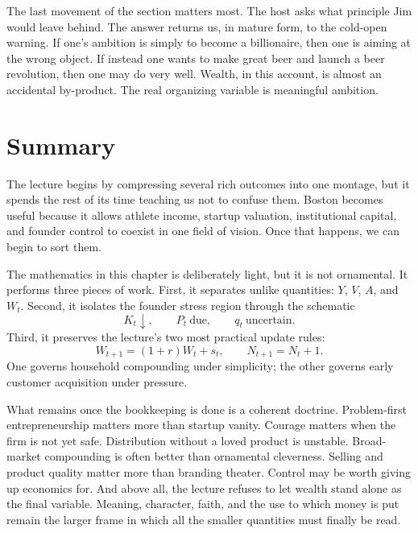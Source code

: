 The last movement of the section matters most. The host asks what principle Jim would leave behind. The answer returns us, in mature form, to the cold-open warning. If one's ambition is simply to become a billionaire, then one is aiming at the wrong object. If instead one wants to make great beer and launch a beer revolution, then one may do very well. Wealth, in this account, is almost an accidental by-product. The real organizing variable is meaningful ambition.

\section{Summary}

The lecture begins by compressing several rich outcomes into one montage, but it spends the rest of its time teaching us not to confuse them. Boston becomes useful because it allows athlete income, startup valuation, institutional capital, and founder control to coexist in one field of vision. Once that happens, we can begin to sort them.

The mathematics in this chapter is deliberately light, but it is not ornamental. It performs three pieces of work. First, it separates unlike quantities: \(Y\), \(V\), \(A\), and \(W_t\). Second, it isolates the founder stress region through the schematic
\[
K_t \downarrow,\qquad P_t\ \text{due},\qquad q_t\ \text{uncertain}.
\]
Third, it preserves the lecture's two most practical update rules:
\[
W_{t+1}=(1+r)W_t+s_t,
\qquad
N_{t+1}=N_t+1.
\]
One governs household compounding under simplicity; the other governs early customer acquisition under pressure.

What remains once the bookkeeping is done is a coherent doctrine. Problem-first entrepreneurship matters more than startup vanity. Courage matters when the firm is not yet safe. Distribution without a loved product is unstable. Broad-market compounding is often better than ornamental cleverness. Selling and product quality matter more than branding theater. Control may be worth giving up economics for. And above all, the lecture refuses to let wealth stand alone as the final variable. Meaning, character, faith, and the use to which money is put remain the larger frame in which all the smaller quantities must finally be read.